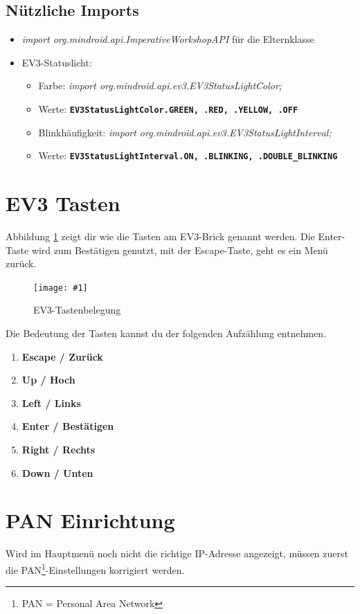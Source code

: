 \documentclass[
	12pt,
	colorbacktitle,
	german,
	accentcolor=tud1c
]{tuddesign/tudexercise}
\newcommand{\gcenter}[4]{
	\begin{figure}[h]
	\centering 
	\texttt{[image: \#1]}
	\caption{#2}
	\label{fig:#3}
	\end{figure}
}
\newcommand{\bfcode}[1]{\texttt{\textbf{#1}}}
\begin{document}
	\subsection{Nützliche Imports}
	\begin{itemize}
	\item \emph{import org.mindroid.api.ImperativeWorkshopAPI} für die Elternklasse
	\item EV3-Statuslicht:
	\begin{itemize}
	\item Farbe: \emph{import org.mindroid.api.ev3.EV3StatusLightColor;}
	\item Werte: \bfcode{EV3StatusLightColor.GREEN, .RED, .YELLOW, .OFF}
	\item Blinkhäufigkeit: \emph{import org.mindroid.api.ev3.EV3StatusLightInterval; }
	\item Werte: \bfcode{EV3StatusLightInterval.ON, .BLINKING, .DOUBLE\_BLINKING}
	\end{itemize}
	\end{itemize}
	
	\newpage

	\newpage

	\newpage

	\newpage
	
	\appendix
	\section{EV3 Tasten}
	Abbildung \ref{fig:buttons} zeigt dir wie die Tasten am EV3-Brick genannt werden. Die Enter-Taste wird zum Bestätigen genutzt, mit der Escape-Taste, geht es ein Menü zurück. 
		\gcenter{img/ev3_buttons.png}{EV3-Tastenbelegung\protect\footnotemark\ }{buttons}{.5\textwidth}
		
	Die Bedeutung der Tasten kannst du der folgenden Aufzählung entnehmen. 
	\begin{enumerate}
	\item \textbf{Escape / Zurück}
	\item \textbf{Up / Hoch}
	\item \textbf{Left / Links}
	\item \textbf{Enter / Bestätigen}
	\item \textbf{Right / Rechts}  
	\item \textbf{Down / Unten}  
	\end{enumerate}
	\newpage
	\section{PAN Einrichtung}
	\label{sec:pan}
			Wird im Hauptmenü noch nicht die richtige IP-Adresse angezeigt, müssen zuerst die PAN\footnote{PAN = Personal Area Network}-Einstellungen korrigiert werden.
		
\end{document}
